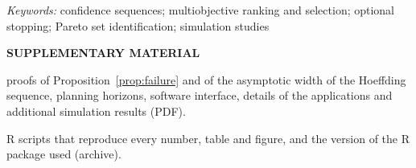 \documentclass[12pt]{article}
\newcommand{\spacingset}[1]{\renewcommand{\baselinestretch}{#1}\small\normalsize}
\theoremstyle{definition}
\begin{document}
\noindent%
{\it Keywords:} confidence sequences; multiobjective ranking and selection; optional stopping; Pareto set identification; simulation studies
\vfill

\newpage
\spacingset{1.8}









\bigskip
\begin{center}
{\large\bf SUPPLEMENTARY MATERIAL}
\end{center}
\begin{description}[leftmargin=*]
\item[Supplement:] proofs of Proposition~\ref{prop:failure} and of the asymptotic width of the Hoeffding sequence, planning horizons, software interface, details of the applications and additional simulation results (PDF).
\item[Code and data:] R scripts that reproduce every number, table and figure, and the version of the R package used (archive).
\end{description}


\spacingset{1}


\end{document}
